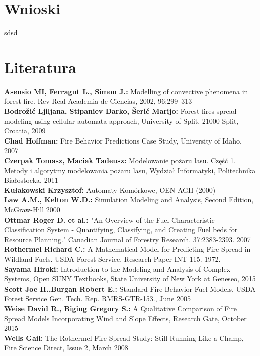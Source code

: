 \documentclass[a4paper, 11pt]{article}
\begin{document}
	\section{Wnioski}
	\indent
	
	sdsd
	\section{Literatura}
	
\textbf{Asensio MI, Ferragut L., Simon J.:} Modelling of convective phenomena in forest fire. Rev Real Academia de Ciencias, 2002, 96:299–313\\
\textbf{Bodrožić Ljiljana, Stipaniev Darko, Šerić Marijo:} Forest fires spread modeling using cellular automata approach, University of Split, 21000 Split, Croatia, 2009 \\
\textbf{Chad Hoffman:} Fire Behavior Predictions Case Study, University of Idaho, 2007\\
\textbf{Czerpak Tomasz, Maciak Tadeusz:} Modelowanie pożaru lasu. Część 1. Metody i algorytmy modelowania pożaru lasu, Wydział Informatyki, Politechnika Białostocka, 2011 \\
\textbf{Kułakowski Krzysztof:} Automaty Komórkowe, OEN AGH (2000) \\
\textbf{Law A.M., Kelton W.D.:} Simulation Modeling and Analysis, Second Edition, McGraw-Hill 2000\\
\textbf{Ottmar Roger D. et al.:} "An Overview of the Fuel Characteristic Classification System - Quantifying, Classifying, and Creating Fuel beds for Resource Planning." Canadian Journal of Forestry Research. 37:2383-2393. 2007\\
\textbf{Rothermel Richard C.:} A Mathematical Model for Predicting Fire Spread in Wildland Fuels. USDA Forest Service. Research Paper INT-115. 1972.\\
\textbf{Sayama Hiroki:} Introduction to the Modeling and Analysis of Complex Systems, Open SUNY Textbooks, State University of New York at Geneseo, 2015\\	
\textbf{Scott Joe H.,Burgan Robert E.:} Standard Fire Behavior Fuel Models, USDA Forest Service Gen. Tech. Rep. RMRS-GTR-153., June 2005\\	
\textbf{Weise David R., Biging Gregory S.:} A Qualitative Comparison of Fire Spread Models Incorporating Wind and Slope Effects, Research Gate, October 2015\\
\textbf{Wells Gail:} The Rothermel Fire-Spread Study: Still Running Like a Champ, Fire Science Direct, Issue 2, March 2008\\




\end{document}

